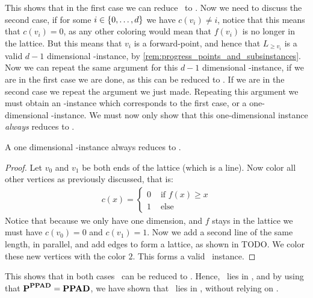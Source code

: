 This shows that in the first case we can reduce \Tarskistar\ to \Sperner. Now we need to discuss the second case, if for some $i \in \left\{0, \dots, d\right\}$ we have $c(v_i) \neq i$, notice that this means that $c(v_i) = 0$, as any other coloring would mean that $f(v_i)$ is no longer in the lattice. But this means that $v_i$ is a forward-point, and hence that $L_{\geq v_i}$ is a valid $d-1$ dimensional \Tarskistar-instance, by \cref{rem:progress_points_and_subsinstances}. Now we can repeat the same argument for this $d-1$ dimensional \Tarskistar-instance, if we are in the first case we are done, as this can be reduced to \Sperner. If we are in the second case we repeat the argument we just made. Repeating this argument we must obtain an \Tarskistar-instance which corresponds to the first case, or a one-dimensional \Tarskistar-instance. We must now only show that this one-dimensional instance \emph{always} reduces to \Sperner.

\begin{claim}
	A one dimensional \Tarskistar-instance always reduces to \Sperner\@.
\end{claim}
\begin{proof}
	Let $v_0$ and $v_1$ be both ends of the lattice (which is a line). Now color all other vertices as previously discussed, that is:
	\begin{align*}
		c(x) =  \begin{cases}
			        0 & \text{ if $f(x) \geq x$} \\
			        1 & \text{ else}
		        \end{cases}
	\end{align*}
	Notice that because we only have one dimension, and $f$ stays in the lattice we must have $c(v_0) = 0$ and $c(v_1) = 1$. Now we add a second line of the same length, in parallel, and add edges to form a lattice, as shown in TODO\@. We color these new vertices with the color $2$. This forms a valid \Sperner\ instance.
\end{proof}

This shows that in both cases \Tarskistar\ can be reduced to \Sperner. Hence, \Tarskistar\ lies in \PPAD, and by using that $\textbf{P}^{\textbf{PPAD}} = \textbf{PPAD}$, we have shown that \Tarski\ lies in \PPAD, without relying on \Brouwer.